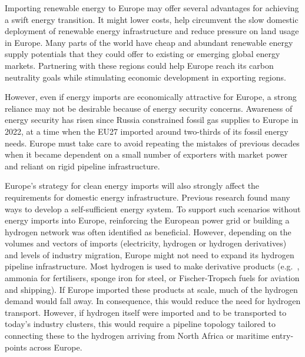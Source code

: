
Importing renewable energy to Europe may offer several advantages for achieving
a swift energy transition. It might lower costs, help circumvent the slow
domestic deployment of renewable energy infrastructure and reduce pressure on
land usage in Europe. Many parts of the world have cheap and abundant renewable
energy supply potentials that they could offer to existing or emerging global
energy markets.\cite{irenaGlobalHydrogenTrade2022, luxSupplyCurves2021,
vanderzwaanTimmermansDream2021, fasihiLongTermHydrocarbon2017,
reichenbergDeepDecarbonization2022, galvanExportingSunshine2022,
armijoFlexibleProduction2020, pfennigGlobalGISbasedPotential2023} Partnering
with these regions could help Europe reach its carbon neutrality goals while
stimulating economic development in exporting regions.


However, even if energy imports are economically attractive for Europe, a strong
reliance may not be desirable because of energy security concerns. Awareness of
energy security has risen since Russia constrained fossil gas supplies to Europe
in 2022,\cite{pedersenLongtermImplications2022} at a time when the EU27 imported
around two-thirds of its fossil energy needs.\cite{eurostatCompleteEnergyBalances2023}
Europe must take care to avoid repeating the mistakes of previous decades when
it became dependent on a small number of exporters with market power and reliant
on rigid pipeline infrastructure.
 

Europe's strategy for clean energy imports will also strongly affect the
requirements for domestic energy infrastructure. Previous research found many
ways to develop a self-sufficient energy
system.\cite{pickeringDiversityOptions2022, trondleHomemadeImported2019,
brownSynergiesSector2018} To support such scenarios without energy imports into
Europe, reinforcing the European power grid or building a hydrogen network was
often identified as beneficial.\cite{neumannPotentialRoleHydrogen2023,
victoriaSpeedTechnological2022} However, depending on the volumes and vectors of
imports (electricity, hydrogen or hydrogen derivatives) and levels of industry
migration, Europe might not need to expand its hydrogen pipeline infrastructure.
Most hydrogen is used to make derivative products (e.g.~, ammonia for
fertilisers, sponge iron for steel, or Fischer-Tropsch fuels for aviation and
shipping).\cite{neumannPotentialRoleHydrogen2023} If Europe imported these
products at scale, much of the hydrogen demand would fall away. In consequence,
this would reduce the need for hydrogen transport. However, if hydrogen itself
were imported and to be transported to today's industry clusters, this would
require a pipeline topology tailored to connecting these to the hydrogen
arriving from North Africa or maritime entry-points across Europe.

